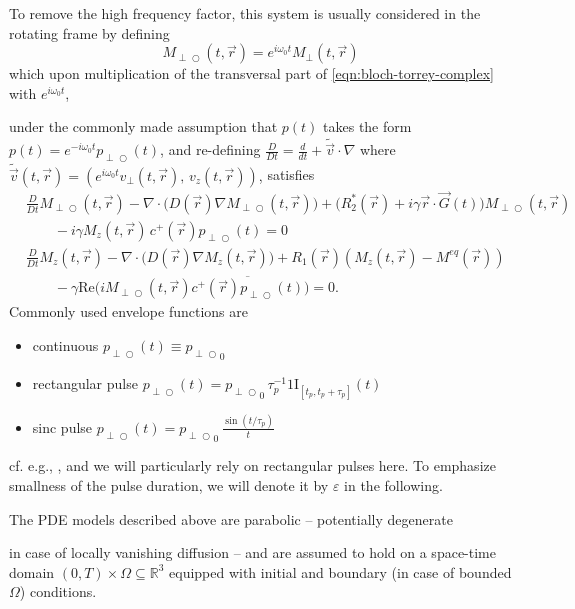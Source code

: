 \documentclass{ws-m3as}
\renewcommand\Re{\mathrm{Re}}
\def\Mpp{M_{\perp\!\!\!\!\!\bigcirc}}
\def\pp{p_{\perp\!\!\!\!\!\bigcirc}}
\newcommand\taup{\varepsilon}
\newcommand{\revision}[1]{{ #1}}
\newcommand{\revisionown}[1]{{ #1}}
\newcommand{\Margin}[1]{}
\begin{document}
To remove the high frequency factor, this system is usually considered in the rotating frame by defining 
\begin{equation}\label{Mperp_prime}
\Mpp(t, \vec r)=e^{i\omega_0t}M_\perp(t, \vec r)
\end{equation}
which upon multiplication of the transversal part of \eqref{eqn:bloch-torrey-complex} with $e^{i\omega_0t}$, 
\Margin{R2 3)}
\revision{under the commonly made assumption} that 
$p(t)$ takes the form $p(t)=e^{-i\omega_0t}\pp(t)$, 
\revisionown{and re-defining $\frac{D}{Dt}=\frac{d}{dt} + \widetilde{\vec v}\cdot\nabla$ where $\widetilde{\vec v}(t, \vec r)=(e^{i\omega_0t}v_\perp(t, \vec r),\,v_z(t, \vec r))$,} 
satisfies
\begin{equation}\label{eqn:bloch-torrey-complex-rotated}
\begin{aligned}
&\frac{D}{Dt}\Mpp(t, \vec r) -\nabla\cdot\bigl(D(\vec r) \nabla \Mpp(t, \vec r)\bigr) +\bigl(R_2^*(\vec r) + i\gamma\vec r \cdot \vec G(t)\bigr)\Mpp(t, \vec r)\\
&\qquad-i\gamma  M_z(t, \vec r) \, c^+(\vec r)\pp(t)
=0
\\    
&\frac{D}{Dt}M_z(t, \vec r) -\nabla\cdot\bigl(D(\vec r) \nabla M_z(t, \vec r)\bigr) 
+R_1(\vec r) (M_z(t, \vec r)-M^{eq}(\vec r))
\\
&\qquad-\gamma\Re\bigl(i \Mpp(t, \vec r)\overline{c^+(\vec r)\pp(t)}\bigr)
=0.
\end{aligned}
\end{equation}
Commonly used envelope functions are 
\begin{itemize}
\item continuous $\pp(t)\equiv {\pp}_0$
\item rectangular pulse $\pp(t)={\pp}_0\,\tau_p^{-1} 1\!\mathrm{I}_{[t_p,t_p+\tau_p]}(t)$
\item sinc pulse $\pp(t)={\pp}_0\,\frac{\sin(t/\tau_p)}{t}$
\end{itemize}
cf. e.g., \cite[page 10]{Uecker2009NonlinearRM}, %
and we will particularly rely on rectangular pulses here.
To emphasize smallness of the pulse duration, we will denote it by $\taup$ in the following.

The PDE models described above are parabolic -- potentially 
\revision{degenerate}
\Margin{R2 4)} 
in case of locally vanishing diffusion -- and are assumed to hold on a space-time domain $(0,T)\times\Omega\subseteq\mathbb{R}^3$ equipped with initial and boundary (in case of bounded $\Omega$) conditions.
\end{document}
